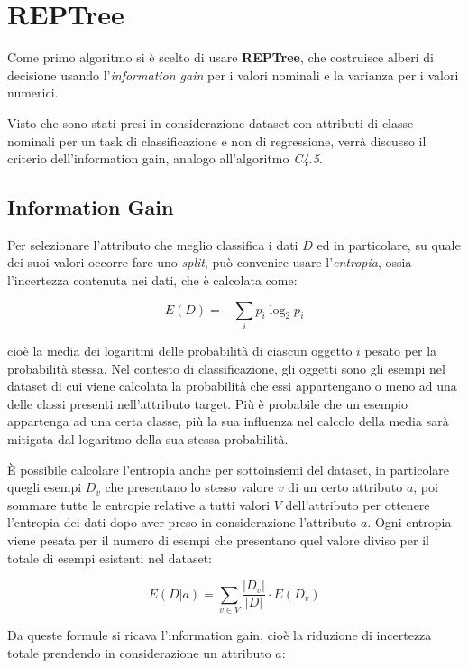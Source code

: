 \chapter{REPTree}
\label{(ch:reptree)}

Come primo algoritmo si è scelto di usare \textbf{REPTree}, che costruisce alberi di decisione usando l'\textit{information gain} per i valori nominali e la varianza per i valori numerici\cite{2Witten:2011:DMP:REPTree}.

Visto che sono stati presi in considerazione dataset con attributi di classe nominali per un task di classificazione e non di regressione, verrà discusso il criterio dell'information gain, analogo all'algoritmo \textit{C4.5}\cite{Quinlan:1993:CPM:152181}.

\section{Information Gain}
Per selezionare l'attributo che meglio classifica i dati $D$ ed in particolare, su quale dei suoi valori occorre fare uno \textit{split}, può convenire usare l'\emph{entropia}\cite{Shannon:1948}, ossia l'incertezza contenuta nei dati, che è calcolata come:

$$ E(D) = - \sum_{i} p_i \log_2 p_i $$

cioè la media dei logaritmi delle probabilità di ciascun oggetto $i$ pesato per la probabilità stessa. Nel contesto di classificazione, gli oggetti sono gli esempi nel dataset di cui viene calcolata la probabilità che essi appartengano o meno ad una delle classi presenti nell'attributo target. Più è probabile che un esempio appartenga ad una certa classe, più la sua influenza nel calcolo della media sarà mitigata dal logaritmo della sua stessa probabilità.

È possibile calcolare l'entropia anche per sottoinsiemi del dataset, in particolare quegli esempi $D_v$ che presentano lo stesso valore $v$ di un certo attributo $a$, poi sommare tutte le entropie relative a tutti valori $V$ dell'attributo per ottenere l'entropia dei dati dopo aver preso in considerazione l'attributo $a$.
Ogni entropia viene pesata per il numero di esempi che presentano quel valore diviso per il totale di esempi esistenti nel dataset:

$$ E(D|a) = \sum_{v \in V} \frac{|D_v|}{|D|} \cdot E(D_v) $$

Da queste formule si ricava l'information gain, cioè la riduzione di incertezza totale prendendo in considerazione un attributo $a$:

